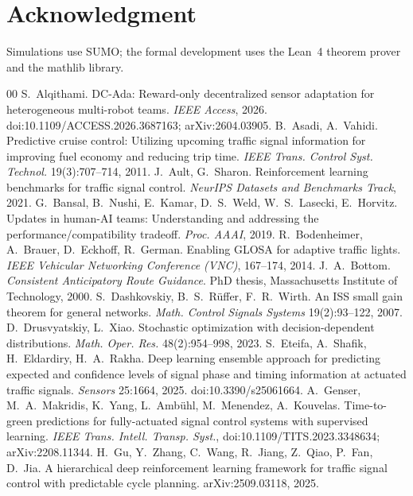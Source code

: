 \section*{Acknowledgment}
Simulations use SUMO; the formal development uses the Lean~4 theorem prover and the mathlib library.

\begin{thebibliography}{00}\footnotesize
{} S.~Alqithami. DC-Ada: Reward-only decentralized sensor adaptation for heterogeneous multi-robot teams. \emph{IEEE Access}, 2026. doi:10.1109/ACCESS.2026.3687163; arXiv:2604.03905.
 B.~Asadi, A.~Vahidi. Predictive cruise control: Utilizing upcoming traffic signal information for improving fuel economy and reducing trip time. \emph{IEEE Trans. Control Syst. Technol.} 19(3):707--714, 2011.
 J.~Ault, G.~Sharon. Reinforcement learning benchmarks for traffic signal control. \emph{NeurIPS Datasets and Benchmarks Track}, 2021.
 G.~Bansal, B.~Nushi, E.~Kamar, D.~S.~Weld, W.~S.~Lasecki, E.~Horvitz. Updates in human-AI teams: Understanding and addressing the performance/compatibility tradeoff. \emph{Proc. AAAI}, 2019.
 R.~Bodenheimer, A.~Brauer, D.~Eckhoff, R.~German. Enabling GLOSA for adaptive traffic lights. \emph{IEEE Vehicular Networking Conference (VNC)}, 167--174, 2014.
 J.~A.~Bottom. \emph{Consistent Anticipatory Route Guidance}. PhD thesis, Massachusetts Institute of Technology, 2000.
 S.~Dashkovskiy, B.~S.~R\"uffer, F.~R.~Wirth. An ISS small gain theorem for general networks. \emph{Math. Control Signals Systems} 19(2):93--122, 2007.
 D.~Drusvyatskiy, L.~Xiao. Stochastic optimization with decision-dependent distributions. \emph{Math. Oper. Res.} 48(2):954--998, 2023.
 S.~Eteifa, A.~Shafik, H.~Eldardiry, H.~A.~Rakha. Deep learning ensemble approach for predicting expected and confidence levels of signal phase and timing information at actuated traffic signals. \emph{Sensors} 25:1664, 2025. doi:10.3390/s25061664.
 A.~Genser, M.~A.~Makridis, K.~Yang, L.~Amb\"uhl, M.~Menendez, A.~Kouvelas. Time-to-green predictions for fully-actuated signal control systems with supervised learning. \emph{IEEE Trans. Intell. Transp. Syst.}, doi:10.1109/TITS.2023.3348634; arXiv:2208.11344.
 H.~Gu, Y.~Zhang, C.~Wang, R.~Jiang, Z.~Qiao, P.~Fan, D.~Jia. A hierarchical deep reinforcement learning framework for traffic signal control with predictable cycle planning. arXiv:2509.03118, 2025.

\end{thebibliography}
